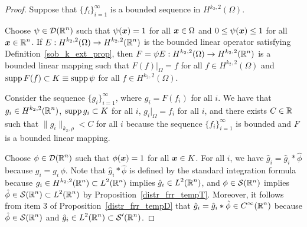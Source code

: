 \begin{proof}
Suppose that $\displaystyle \{f_i\}_{i=1}^\infty$ is a bounded sequence in
$\displaystyle H^{k_2,2}(\Omega)$.

Choose $\displaystyle \psi\in \mathcal{D}(\mathbb{R}^n)$ such that $\psi({\bm{x}})=1$ for all
${\bm{x}}\in \Omega$ and $0\leq \psi({\bm{x}}) \leq 1$ for all
$\displaystyle {\bm{x}}\in \mathbb{R}^n$.  If
$\displaystyle E:H^{k_2,2}(\Omega) \rightarrow H^{k_2,2}(\mathbb{R}^n)$
is the bounded linear operator satisfying
Definition~\ref{sob_k_ext_prop}, then
$\displaystyle F=\psi E:H^{k_2,2}(\Omega) \rightarrow H^{k_2,2}(\mathbb{R}^n)$
is a bounded linear mapping such that $F(f)\big|_{\Omega} = f$ for all
$\displaystyle f\in H^{k_2,2}(\Omega)$ and
$\operatorname{supp} F(f) \subset K \equiv \operatorname{supp} \psi$ for all
$\displaystyle f\in H^{k_2,2}(\Omega)$.

Consider the sequence $\displaystyle \{g_i \}_{i=1}^\infty$, where
$g_i = F(f_i)$ for all $i$.  We have that
$\displaystyle g_i \in H^{k_2,2}(\mathbb{R}^n)$,
$\operatorname{supp} g_i \subset K$ for all $i$, $g_i\big|_{\Omega} = f_i$ for all
$i$, and there exists $C \in \mathbb{R}$ such that
$\displaystyle \|g_i\|_{k_2,\rho} < C$ for
all $i$ because the sequence $\displaystyle \{f_i\}_{i=1}^\infty$ is
bounded and $F$ is a bounded linear mapping.

Choose $\displaystyle \phi \in \mathcal{D}(\mathbb{R}^n)$ such that $\phi({\bm{x}})=1$ for all
${\bm{x}}\in K$.  For all $i$, we have $\hat{g}_i = \hat{g}_i \ast \hat{\phi}$
because $g_i = g_i \, \phi$.  Note that $\hat{g}_i \ast \hat{\phi}$ is
defined by the standard integration formula because
$\displaystyle g_i \in H^{k_2,2}(\mathbb{R}^n) \subset L^2(\mathbb{R}^n)$ implies
$\displaystyle \hat{g}_i \in L^2(\mathbb{R}^n)$, and $\phi \in \mathcal{S}(\mathbb{R}^n)$
implies $\displaystyle \hat{\phi} \in \mathcal{S}(\mathbb{R}^n) \subset L^2(\mathbb{R}^n)$
by Proposition~\ref{distr_frr_tempT}.  Moreover, it follows from
item 3 of Proposition~\ref{distr_frr_tempD}
that $\displaystyle \hat{g}_i = \hat{g}_i \ast \hat{\phi} \in C^\infty(\mathbb{R}^n)$
because
$\displaystyle \hat{\phi} \in \mathcal{S}(\mathbb{R}^n)$ and
$\displaystyle \hat{g}_i \in L^2(\mathbb{R}^n) \subset \mathcal{S}'(\mathbb{R}^n)$.


\end{proof}
